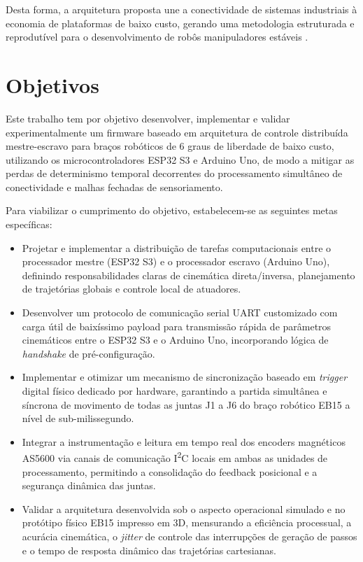 Desta forma, a arquitetura proposta une a conectividade de sistemas industriais à economia de plataformas de baixo custo, gerando uma metodologia estruturada e reprodutível para o desenvolvimento de robôs manipuladores estáveis \cite{okter2025ros}.

\section{Objetivos}
\label{sec:objetivos}

Este trabalho tem por objetivo desenvolver, implementar e validar experimentalmente um firmware baseado em arquitetura de controle distribuída mestre-escravo para braços robóticos de 6 graus de liberdade de baixo custo, utilizando os microcontroladores ESP32 S3 e Arduino Uno, de modo a mitigar as perdas de determinismo temporal decorrentes do processamento simultâneo de conectividade e malhas fechadas de sensoriamento.

Para viabilizar o cumprimento do objetivo, estabelecem-se as seguintes metas específicas:

\begin{itemize}
    \item Projetar e implementar a distribuição de tarefas computacionais entre o processador mestre (ESP32 S3) e o processador escravo (Arduino Uno), definindo responsabilidades claras de cinemática direta/inversa, planejamento de trajetórias globais e controle local de atuadores.
    \item Desenvolver um protocolo de comunicação serial UART customizado com carga útil de baixíssimo payload para transmissão rápida de parâmetros cinemáticos entre o ESP32 S3 e o Arduino Uno, incorporando lógica de \textit{handshake} de pré-configuração.
    \item Implementar e otimizar um mecanismo de sincronização baseado em \textit{trigger} digital físico dedicado por hardware, garantindo a partida simultânea e síncrona de movimento de todas as juntas J1 a J6 do braço robótico EB15 a nível de sub-milissegundo.
    \item Integrar a instrumentação e leitura em tempo real dos encoders magnéticos AS5600 via canais de comunicação I\textsuperscript{2}C locais em ambas as unidades de processamento, permitindo a consolidação do feedback posicional e a segurança dinâmica das juntas.
    \item Validar a arquitetura desenvolvida sob o aspecto operacional simulado e no protótipo físico EB15 impresso em 3D, mensurando a eficiência processual, a acurácia cinemática, o \textit{jitter} de controle das interrupções de geração de passos e o tempo de resposta dinâmico das trajetórias cartesianas.
\end{itemize}
